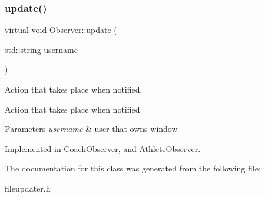 \subsubsection{\texorpdfstring{update()}{update()}}
{\footnotesize\ttfamily virtual void Observer\+::update (\begin{DoxyParamCaption}\item[{std\+::string}]{username }\end{DoxyParamCaption})\hspace{0.3cm}{\ttfamily [pure virtual]}}



Action that takes place when notified. 

Action that takes place when notified 
\begin{DoxyParams}{Parameters}
{\em username} & user that owns window \\
\hline
\end{DoxyParams}


Implemented in \mbox{\hyperlink{classCoachObserver_a374f9d569656139d5dd6cebe73fd4169}{Coach\+Observer}}, and \mbox{\hyperlink{classAthleteObserver_adc653afe856672101bd935874967485e}{Athlete\+Observer}}.



The documentation for this class was generated from the following file\+:\begin{DoxyCompactItemize}
\item 
fileupdater.\+h\end{DoxyCompactItemize}
